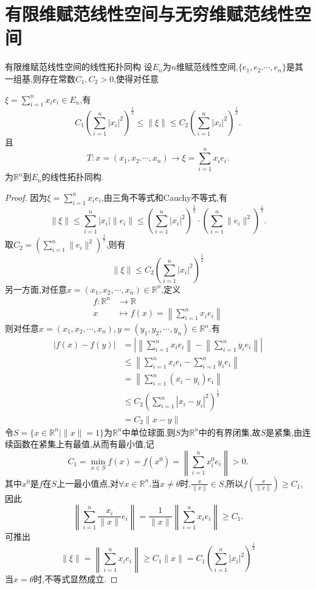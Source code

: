 \documentclass[lang=cn,18pt]{elegantbook}
\begin{document}
\section{有限维赋范线性空间与无穷维赋范线性空间}
\begin{theorem}{有限维赋范线性空间的线性拓扑同构}
    设$E_n$为$n$维赋范线性空间,$\{e_1,e_2.\cdots,e_n\}$是其一组基,则存在常数$C_1,C_2 >0$,使得对任意
    
    $\xi=\sum\limits_{i=1}^{n}x_ie_i \in E_n$,有
    $$C_{1}\left(\sum\limits_{i=1}^{n}|x_i|^2 \right)^{\frac{1}{2}} \leqslant \|\xi \| \leqslant C_{2}\left(\sum\limits_{i=1}^{n}|x_i|^2 \right)^{\frac{1}{2}}.$$
    且
    $$T:x=(x_1,x_2.\cdots,x_n)\to \xi = \sum\limits_{i=1}^{n}x_ie_i.$$
    为$\mathbb{R}^{n}$到$E_n$的线性拓扑同构.
\end{theorem}
\begin{proof}
    因为$\xi = \sum\limits_{i=1}^{n}x_ie_i$,由三角不等式和Cauchy不等式,有
    $$\| \xi \| \leqslant \sum\limits_{i=1}^{n}|x_i|\|e_i\| \leqslant \left(\sum\limits_{i=1}^{n}|x_i|^2 \right)^{\frac{1}{2}}\cdot \left(\sum\limits_{i=1}^{n}\|e_i\|^2 \right)^{\frac{1}{2}}.$$
    取$C_2=\left(\sum\limits_{i=1}^{n}\|e_i\|^2 \right)^{\frac{1}{2}}$,则有
    $$\|\xi \| \leqslant C_2 \left(\sum\limits_{i=1}^{n}|x_i|^2 \right)^{\frac{1}{2}}$$
    另一方面,对任意$x=(x_1,x_2,\cdots,x_n)\in \mathbb{R}^n$,定义
    \begin{align*}
        f:\mathbb{R}^n & \to \mathbb{R} \\
        x & \mapsto f(x)=\left\|\sum\limits_{i=1}^{n}x_i e_i \right\|
    \end{align*}
    则对任意$x=(x_1,x_2,\cdots,x_n),y=(y_1,y_2,\cdots,y_n) \in \mathbb{R}^n.$有
    \begin{align*}
        |f(x)-f(y)| & =\left| \left\|\sum\limits_{i=1}^{n}x_i e_i\right\| -\left\|\sum\limits_{i=1}^{n}y_i e_i\right\| \right| \\
        & \leqslant \left\|\sum\limits_{i=1}^{n}x_i e_i -\sum\limits_{i=1}^{n}y_i e_i \right\| \\
        & = \left\|\sum\limits_{i=1}^{n}(x_i-y_i) e_i \right\| \\
        & \leqslant C_2 \left(\sum\limits_{i=1}^{n}|x_i -y_i|^2 \right)^{\frac{1}{2}} \\
        & = C_2\|x-y\|
    \end{align*}
    令$S=\{x \in \mathbb{R}^n| \|x\|=1\}$为$\mathbb{R}^n$中单位球面,则$S$为$\mathbb{R}^n$中的有界闭集,故$S$是紧集,由连续函数在紧集上有最值,从而有最小值,记
    $$C_1=\min\limits_{x \in S}f(x)=f(x^0)=\left\|\sum\limits_{i=1}^{n}x_{i}^{0}e_i \right\| >0.$$
    其中$x^0$是$f$在$S$上一最小值点,对$\forall x \in \mathbb{R}^n$.当$x \not= \theta$时,$\frac{x}{\|x\|}\in S$,所以$f(\frac{x}{\|x\|})\geqslant C_1$,因此
    $$\left\| \sum\limits_{i=1}^{n}\frac{x_i}{\|x\|}e_i \right\|=\frac{1}{\|x\|}\left\|\sum\limits_{i=1}^{n}x_i e_i \right\| \geqslant C_1.$$
    可推出
    $$\|\xi\|=\left\|\sum\limits_{i=1}^{n}x_i e_i \right\| \geqslant C_1\|x\|=C_1\left(\sum\limits_{i=1}^{n}|x_i|^2\right)^{\frac{1}{2}}$$
    当$x=\theta $时,不等式显然成立.


\end{proof}
\end{document}
